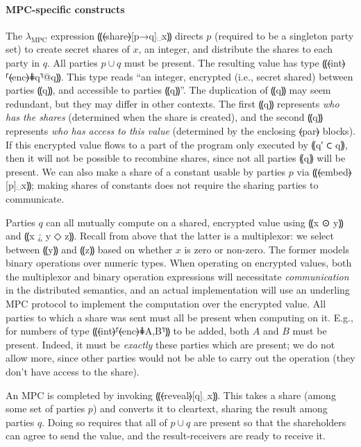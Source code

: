 \documentclass{report}
\newcommand{\mpc}{\ensuremath{\lambda_{\mathrm{MPC}}}\xspace}
\begin{document}
\paragraph{MPC-specific constructs}
%
The \mpc expression ⸨⦑share⦒[p→q]␣x⸩ directs $p$ (required to be a singleton party set) to
create secret shares of $x$, an integer, and distribute the shares to
each party in
$q$. All parties $p \cup q$ must be present. The resulting value
has type ⸨⦑int⦒⸢⦑enc⦒⋕q⸣@q⸩. This type reads “an integer, encrypted
(i.e., secret shared) between parties ⸨q⸩, and accessible to parties
⸨q⸩”. The duplication of ⸨q⸩ may seem redundant, but they may differ
in other contexts. The first ⸨q⸩ represents \emph{who has the
shares} (determined when the share is created), and the second ⸨q⸩
represents \emph{who has access to this value} (determined by the
enclosing ⦑par⦒ blocks). If this encrypted value flows to a part of
the program only executed by ⸨q′ ⊂ q⸩, then it will not be possible to
recombine shares, since not all parties ⸨q⸩ will be present.
We can also make a share of a constant
usable by parties $p$ via ⸨⦑embed⦒[p]␣x⸩; making shares of
constants does not require the sharing parties to communicate.

Parties $q$ can all mutually compute on a shared, encrypted value
using ⸨x ⊙ y⸩ and ⸨x ¿ y ◇ z⸩.  Recall from above that the latter is a
multiplexor: we select between ⸨y⸩ and ⸨z⸩ based on whether $x$ is zero or
non-zero. The former models binary operations over numeric types.
When operating on encrypted values, both the multiplexor and binary
operation expressions will necessitate \emph{communication} in the
distributed semantics, and an actual implementation will use an
underling MPC protocol to implement the computation over the encrypted value.
All parties to which a share was sent must
all be present when computing on it. E.g., for numbers of type
⸨⦑int⦒⸢⦑enc⦒⋕{A,B}⸣⸩ to be added, both $A$ and $B$ must be
present. Indeed, it must be \emph{exactly} these parties which are
present; we do not allow more, since other parties would not be
able to carry out the operation (they don't have access to the
share).

An MPC is completed by invoking ⸨⦑reveal⦒[q]␣x⸩. This takes a share
(among some set of parties $p$) and converts it to cleartext,
sharing the result among parties $q$. Doing so requires that all of
$p \cup q$ are present so that the shareholders
can agree to send the value, and the result-receivers are ready to
receive it.
\end{document}
